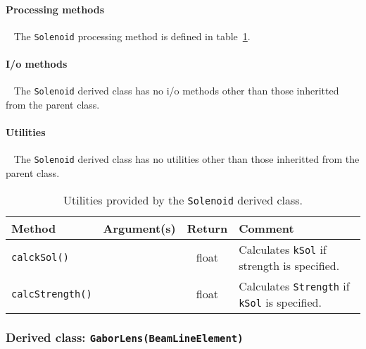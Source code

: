 \paragraph{Processing methods} ~\newline
\noindent
The \texttt{Solenoid} processing method is defined in
table~\ref{Tab:Slnd:Methods}.

\paragraph{I/o methods} ~\newline
\noindent
The \texttt{Solenoid} derived class has no i/o methods other
than those inheritted from the parent class.

\paragraph{Utilities} ~\newline
\noindent
The \texttt{Solenoid} derived class has no utilities other
than those inheritted from the parent class. 

\begin{table}[h]
  \caption{
    Utilities provided by the \texttt{Solenoid} derived
    class. 
  }
  \label{Tab:Slnd:Methods}
  \begin{center}
    \begin{tabular}{|l|c|c|p{7cm}|}
      \hline
      \textbf{Method} & \textbf{Argument(s)} & \textbf{Return} & \textbf{Comment}                      \\
      \hline
      \texttt{calckSol()}     &  & float & Calculates \texttt{kSol} if strength is specified.          \\
      \texttt{calcStrength()} &  & float & Calculates \texttt{Strength} if \texttt{kSol} is specified. \\
      \hline
    \end{tabular}
  \end{center}
\end{table}

\subsubsection{Derived class: \texttt{GaborLens(BeamLineElement)}}

